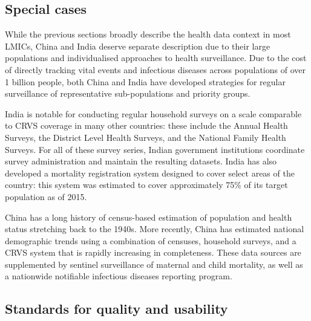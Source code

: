 \documentclass[
]{report}
\begin{document}
\hypertarget{special-cases}{%
\subsection{Special cases}\label{special-cases}}

While the previous sections broadly describe the health data context in most LMICs, China and India deserve separate description due to their large populations and individualised approaches to health surveillance. Due to the cost of directly tracking vital events and infectious diseases across populations of over 1 billion people, both China and India have developed strategies for regular surveillance of representative sub-populations and priority groups.

India is notable for conducting regular household surveys on a scale comparable to CRVS coverage in many other countries: these include the Annual Health Surveys, the District Level Health Surveys, and the National Family Health Surveys. For all of these survey series, Indian government institutions coordinate survey administration and maintain the resulting datasets.\autocite{Dandona2016} India has also developed a mortality registration system designed to cover select areas of the country: this system was estimated to cover approximately 75\% of its target population as of 2015.\autocite{Kumar2019}

China has a long history of census-based estimation of population and health status stretching back to the 1940s.\autocite{Banister2004} More recently, China has estimated national demographic trends using a combination of censuses, household surveys, and a CRVS system that is rapidly increasing in completeness.\autocite{Zeng2020} These data sources are supplemented by sentinel surveillance of maternal and child mortality, as well as a nationwide notifiable infectious diseases reporting program.\autocite{He2017,Vlieg2017}

\hypertarget{standards-for-quality-and-usability}{%
\subsection{Standards for quality and usability}\label{standards-for-quality-and-usability}}
\end{document}
